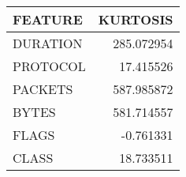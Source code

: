 \begin{tabular}{lr}
\toprule
 FEATURE &   KURTOSIS \\
\midrule
DURATION & 285.072954 \\
PROTOCOL &  17.415526 \\
 PACKETS & 587.985872 \\
   BYTES & 581.714557 \\
   FLAGS &  -0.761331 \\
   CLASS &  18.733511 \\
\bottomrule
\end{tabular}
